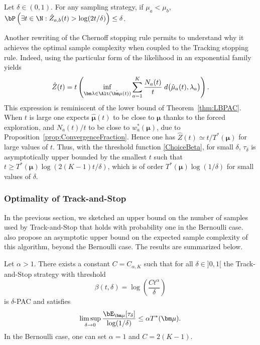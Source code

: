 \documentclass[proc]{edpsmath}
\begin{document}
	\begin{lemma}\label{lem:deltaPAC} 
		Let $\delta \in (0,1)$. For any sampling strategy, if $\mu_a<\mu_b$, 
		$\bP\left(\exists t\in \N : \hat{Z}_{a,b}(t) > \log(2t/\delta)\right) \leq \delta$.
	\end{lemma}
	
	Another rewriting of the Chernoff stopping rule permits to understand why it achieves the optimal sample complexity when coupled to the Tracking stopping rule. Indeed, using the particular form of the likelihood in an exponential family yields 
	\[\hat{Z}(t) = t \left(\inf_{\bm\lambda \in \Alt(\hat{\bm\mu}(t))} \sum_{a=1}^K \frac{N_a(t)}{t}\; d\big(\hat{\mu}_a(t),\lambda_a\big)\right).\]
	This expression is reminiscent of the lower bound of Theorem~\ref{thm:LBPAC}. When $t$ is large one expects $\hat{\bm\mu}(t)$ to be close to $\bm \mu$ thanks to the forced exploration, and $N_a(t)/t$ to be close to $w^*_a(\bm\mu)$, due to Proposition~\ref{prop:ConvergenceFraction}. Hence one has $\hat{Z}(t) \simeq t/T^*(\bm \mu)$ for large values of $t$. Thus, with the threshold function \eqref{ChoiceBeta}, for small $\delta$, $\tau_\delta$ is asymptotically upper bounded by the smallest $t$ such that $t \geq T^*(\bm\mu)\log(2(K-1)t/\delta)$, which is of order $T^*(\bm \mu) \log(1/\delta)$ for small values of $\delta$.  
	
	
	\subsubsection{Optimality of Track-and-Stop}
	
	In the previous section, we sketched an upper bound on the number of samples used by Track-and-Stop that holds with probability one in the Bernoulli case. \cite{GK16} also propose an asymptotic upper bound on the expected sample complexity of this algorithm, beyond the Bernoulli case. The results are summarized below. 
	
	\begin{theorem}\label{thm:optimTaS} Let $\alpha > 1$. There exists a constant $C=C_{\alpha,K}$ such that for all $\delta \in ]0,1[$ the Track-and-Stop strategy with threshold \[\beta(t,\delta) = \log \left(\frac{C t^\alpha}{\delta}\right)\]
		is $\delta$-PAC and satisfies 
		\[\limsup_{\delta \rightarrow 0}\frac{\bE_{\bm\mu}[\tau_\delta]}{\log(1/\delta)} \leq \alpha T^*(\bm\mu).\]
		In the Bernoulli case, one can set $\alpha=1$ and $C=2(K-1)$.
	\end{theorem}
	
\end{document}
